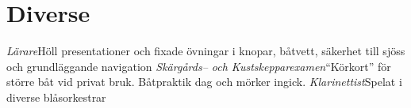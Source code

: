 \documentclass[11pt,a4paper,sans]{moderncv}   %
\begin{document}
\section{Diverse}
{\textit{Lärare}}{Höll presentationer och fixade övningar i knopar, båtvett, säkerhet till sjöss och grundläggande navigation}
{\textit{Skärgårds-- och Kustskepparexamen}}{``Körkort'' för större båt vid privat bruk. Båtpraktik dag och mörker ingick.} 
{\textit{Klarinettist}}{Spelat i diverse blåsorkestrar}
\end{document}
